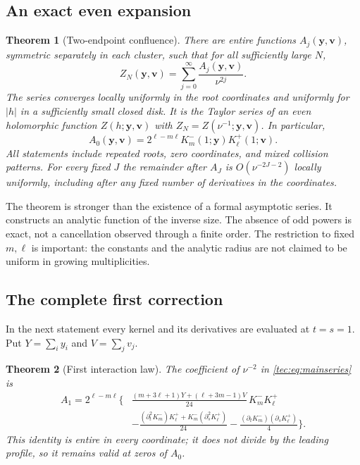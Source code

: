 \documentclass[11pt,a4paper]{article}
\numberwithin{equation}{section}
\newtheorem{theorem}{Theorem}[section]
\theoremstyle{definition}
\theoremstyle{remark}
\newcommand{\by}{\boldsymbol{y}}
\newcommand{\bv}{\boldsymbol v}
\begin{document}
\subsection{An exact even expansion}
\begin{theorem}[Two-endpoint confluence]\label{tec:thm:main}
There are entire functions $A_j(\by,\bv)$, symmetric separately in each
cluster, such that for all sufficiently large $N$,
\begin{equation}\label{tec:eq:mainseries}
 Z_N(\by,\bv)=\sum_{j=0}^{\infty}\frac{A_j(\by,\bv)}{\nu^{2j}}.
\end{equation}
The series converges locally uniformly in the root coordinates and
uniformly for $|h|$ in a sufficiently small closed disk. It is the Taylor
series of an even holomorphic function $Z(h;\by,\bv)$ with
$Z_N=Z(\nu^{-1};\by,\bv)$. In particular,
\begin{equation}\label{tec:eq:A0}
 A_0(\by,\bv)=2^{\ell-m\ell}
       K_m^-(1;\by)K_\ell^+(1;\bv).
\end{equation}
All statements include repeated roots, zero coordinates, and mixed
collision patterns. For every fixed $J$ the remainder after $A_J$ is
$O(\nu^{-2J-2})$ locally uniformly, including after any fixed number of
derivatives in the coordinates.
\end{theorem}

The theorem is stronger than the existence of a formal asymptotic series.
It constructs an analytic function of the inverse size. The absence of
odd powers is exact, not a cancellation observed through a finite order.
The restriction to fixed $m,\ell$ is important: the constants and the
analytic radius are not claimed to be uniform in growing multiplicities.

\subsection{The complete first correction}
In the next statement every kernel and its derivatives are evaluated at
$t=s=1$. Put $Y=\sum_i y_i$ and $V=\sum_j v_j$.
\begin{theorem}[First interaction law]\label{tec:thm:first}
The coefficient of $\nu^{-2}$ in \eqref{tec:eq:mainseries} is
\begin{align}\label{tec:eq:A1}
 A_1=2^{\ell-m\ell}\Bigg\{&
 \frac{(m+3\ell+1)Y+(\ell+3m-1)V}{24}\,K_m^-K_\ell^+
 \nonumber\\[-1mm]
 &-\frac{(\partial_t^2K_m^-)K_\ell^+
             +K_m^-(\partial_s^2K_\ell^+)}{24}
 -\frac{(\partial_tK_m^-)(\partial_sK_\ell^+)}4\Bigg\}.
\end{align}
This identity is entire in every coordinate; it does not divide by the
leading profile, so it remains valid at zeros of $A_0$.
\end{theorem}
\end{document}
